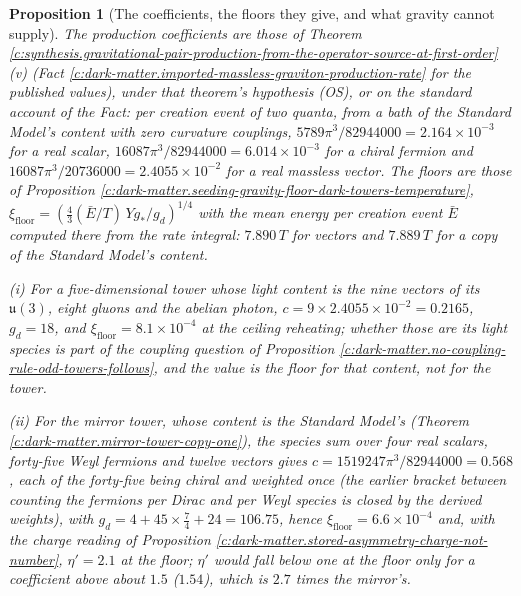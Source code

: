 \documentclass[11pt]{article}
\newtheorem{proposition}[theorem]{Proposition}
\theoremstyle{definition}
\theoremstyle{plain}
\newcommand{\changedmark}[2]{\marginpar{\raggedright\scriptsize\color{#1}#2}}
\begin{document}
\begin{proposition}[The coefficients, the floors they give, and what gravity cannot supply]\label{c:dark-matter.coefficients-floors-they-give-what-gravity}
\changedmark{BurntOrange}{changed since the deposit}
The production coefficients are those of Theorem \ref{c:synthesis.gravitational-pair-production-from-the-operator-source-at-first-order}(v) (Fact \ref{c:dark-matter.imported-massless-graviton-production-rate} for the published values), under that theorem's hypothesis (OS), or on the standard account of the Fact: per creation event of two quanta, from a bath of the Standard Model's content with zero curvature couplings, $5789\pi^{3}/82944000 = 2.164 \times 10^{-3}$ for a real scalar, $16087\pi^{3}/82944000 = 6.014 \times 10^{-3}$ for a chiral fermion and $16087\pi^{3}/20736000 = 2.4055 \times 10^{-2}$ for a real massless vector. The floors are those of Proposition \ref{c:dark-matter.seeding-gravity-floor-dark-towers-temperature}, $\xi_{\mathrm{floor}} = (\tfrac43(\bar{E}/T)\,Y g_{*}/g_{d})^{1/4}$ with the mean energy per creation event $\bar{E}$ computed there from the rate integral: $7.890\,T$ for vectors and $7.889\,T$ for a copy of the Standard Model's content.

(i) For a five-dimensional tower whose light content is the nine vectors of its $\mathfrak{u}(3)$, eight gluons and the abelian photon, $c = 9 \times 2.4055 \times 10^{-2} = 0.2165$, $g_{d} = 18$, and $\xi_{\mathrm{floor}} = 8.1 \times 10^{-4}$ at the ceiling reheating; whether those are its light species is part of the coupling question of Proposition \ref{c:dark-matter.no-coupling-rule-odd-towers-follows}, and the value is the floor for that content, not for the tower.

(ii) For the mirror tower, whose content is the Standard Model's (Theorem \ref{c:dark-matter.mirror-tower-copy-one}), the species sum over four real scalars, forty-five Weyl fermions and twelve vectors gives $c = 1519247\pi^{3}/82944000 = 0.568$, each of the forty-five being chiral and weighted once (the earlier bracket between counting the fermions per Dirac and per Weyl species is closed by the derived weights), with $g_{d} = 4 + 45 \times \tfrac{7}{4} + 24 = 106.75$, hence $\xi_{\mathrm{floor}} = 6.6 \times 10^{-4}$ and, with the charge reading of Proposition \ref{c:dark-matter.stored-asymmetry-charge-not-number}, $\eta' = 2.1$ at the floor; $\eta'$ would fall below one at the floor only for a coefficient above about $1.5$ ($1.54$), which is $2.7$ times the mirror's.


\end{proposition}
\end{document}
